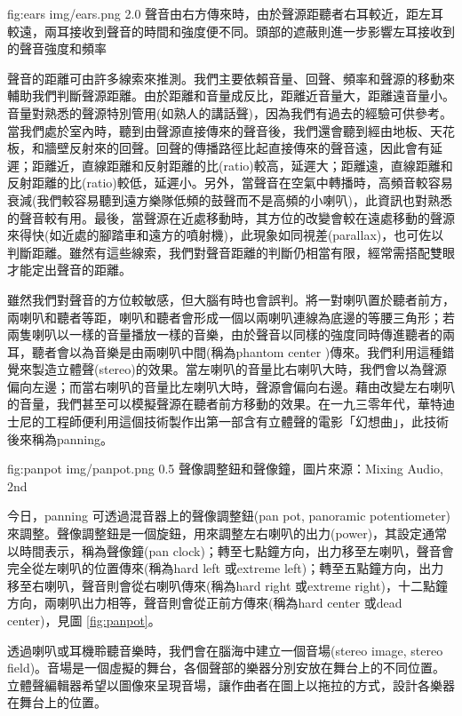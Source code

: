 \documentclass[12pt,a4paper,oneside]{report}
\begin{document}
\figurewithcaption
{fig:ears}
{img/ears.png}
{2.0}
{聲音由右方傳來時，由於聲源距聽者右耳較近，距左耳較遠，兩耳接收到聲音的時間和強度便不同。頭部的遮蔽則進一步影響左耳接收到的聲音強度和頻率}

聲音的距離可由許多線索來推測。我們主要依賴音量、回聲、頻率和聲源的移動來輔助我們判斷聲源距離。由於距離和音量成反比，距離近音量大，距離遠音量小。音量對熟悉的聲源特別管用(如熟人的講話聲)，因為我們有過去的經驗可供參考。當我們處於室內時，聽到由聲源直接傳來的聲音後，我們還會聽到經由地板、天花板，和牆壁反射來的回聲。回聲的傳播路徑比起直接傳來的聲音遠，因此會有延遲；距離近，直線距離和反射距離的比(ratio)較高，延遲大；距離遠，直線距離和反射距離的比(ratio)較低，延遲小。另外，當聲音在空氣中轉播時，高頻音較容易衰減(我們較容易聽到遠方樂隊低頻的鼓聲而不是高頻的小喇叭)，此資訊也對熟悉的聲音較有用。最後，當聲源在近處移動時，其方位的改變會較在遠處移動的聲源來得快(如近處的腳踏車和遠方的噴射機)，此現象如同視差(parallax)\cite{wikiSoundLocalization}，也可佐以判斷距離。雖然有這些線索，我們對聲音距離的判斷仍相當有限，經常需搭配雙眼才能定出聲音的距離。 

雖然我們對聲音的方位較敏感，但大腦有時也會誤判。將一對喇叭置於聽者前方，兩喇叭和聽者等距，喇叭和聽者會形成一個以兩喇叭連線為底邊的等腰三角形；若兩隻喇叭以一樣的音量播放一樣的音樂，由於聲音以同樣的強度同時傳進聽者的兩耳，聽者會以為音樂是由兩喇叭中間(稱為phantom center \cite{mixingAudio})傳來。我們利用這種錯覺來製造立體聲(stereo)的效果。當左喇叭的音量比右喇叭大時，我們會以為聲源偏向左邊；而當右喇叭的音量比左喇叭大時，聲源會偏向右邊。藉由改變左右喇叭的音量，我們甚至可以模擬聲源在聽者前方移動的效果。在一九三零年代，華特迪士尼的工程師便利用這個技術製作出第一部含有立體聲的電影「幻想曲」\cite{wikiFantasia}，此技術後來稱為panning。

\figurewithcaption
{fig:panpot}
{img/panpot.png}
{0.5}
{聲像調整鈕和聲像鐘，圖片來源：Mixing Audio, 2nd}

今日，panning 可透過混音器上的聲像調整鈕(pan pot, panoramic potentiometer)來調整。聲像調整鈕是一個旋鈕，用來調整左右喇叭的出力(power)，其設定通常以時間表示，稱為聲像鐘(pan clock)；轉至七點鐘方向，出力移至左喇叭，聲音會完全從左喇叭的位置傳來(稱為hard left 或extreme left)；轉至五點鐘方向，出力移至右喇叭，聲音則會從右喇叭傳來(稱為hard right 或extreme right)，十二點鐘方向，兩喇叭出力相等，聲音則會從正前方傳來(稱為hard center 或dead center)，見圖 \ref{fig:panpot}。


透過喇叭或耳機聆聽音樂時，我們會在腦海中建立一個音場(stereo image, stereo field)。音場是一個虛擬的舞台，各個聲部的樂器分別安放在舞台上的不同位置。 立體聲編輯器希望以圖像來呈現音場，讓作曲者在圖上以拖拉的方式，設計各樂器在舞台上的位置。
\end{document}
